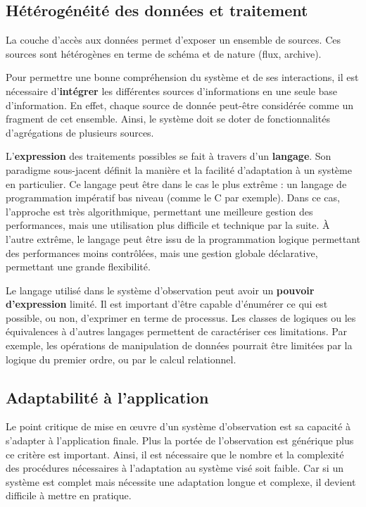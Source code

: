 \subsection{Hétérogénéité des données et traitement}
La couche d'accès aux données permet d'exposer un ensemble de sources. Ces sources sont hétérogènes en terme de schéma et de nature (flux, archive).

Pour permettre une bonne compréhension du système et de ses interactions, il est nécessaire d'\textbf{intégrer} les différentes sources d'informations en une seule base d'information. En effet, chaque source de donnée peut-être considérée comme un fragment de cet ensemble. Ainsi, le système doit se doter de fonctionnalités d'agrégations de plusieurs sources.

L'\textbf{expression} des traitements possibles se fait à travers d'un \textbf{langage}. Son paradigme sous-jacent définit la manière et la facilité d'adaptation à un système en particulier. Ce langage peut être dans le cas le plus extrême : un langage de programmation impératif bas niveau (comme le C par exemple). Dans ce cas, l'approche est très algorithmique, permettant une meilleure gestion des performances, mais une utilisation plus difficile et technique par la suite. À l'autre extrême, le langage peut être issu de la programmation logique permettant des performances moins contrôlées, mais une gestion globale déclarative, permettant une grande flexibilité.

Le langage utilisé dans le système d'observation peut avoir un \textbf{pouvoir d'expression} limité. Il est important d'être capable d'énumérer ce qui est possible, ou non, d'exprimer en terme de processus. Les classes de logiques ou les équivalences à d'autres langages permettent de caractériser ces limitations. Par exemple, les opérations de manipulation de données pourrait être limitées par la logique du premier ordre, ou par le calcul relationnel.

\subsection{Adaptabilité à l'application}
Le point critique de mise en œuvre d'un système d'observation est sa capacité à s'adapter à l'application finale. Plus la portée de l'observation est générique plus ce critère est important. Ainsi, il est nécessaire que le nombre et la complexité des procédures nécessaires à l'adaptation au système visé soit faible. Car si un système est complet mais nécessite une adaptation longue et complexe, il devient difficile à mettre en pratique.


